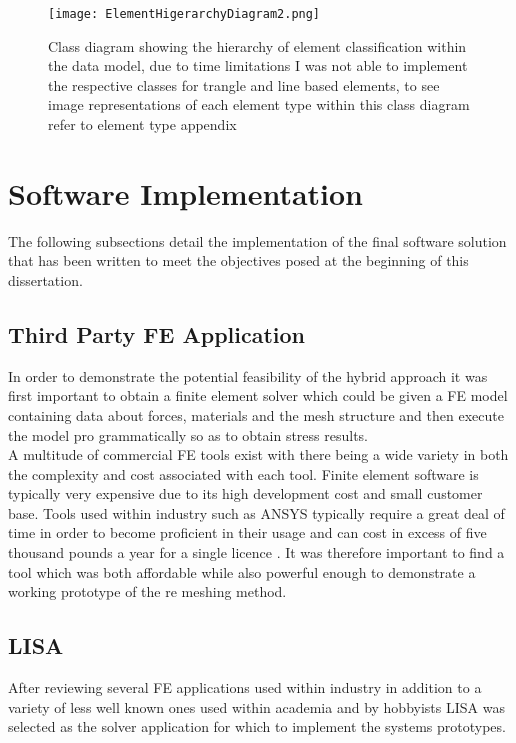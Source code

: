 \documentclass{article}
\begin{document}
\begin{figure}
  \centerline{\texttt{[image: ElementHigerarchyDiagram2.png]}}
  \caption{Class diagram showing the hierarchy of element classification within the data model, due to time limitations I was not able to implement the respective classes for trangle and line based elements, to see image representations of each element type within this class diagram refer to element type appendix}
  \label{fig:h-refinementImp}
\end{figure}


\section{Software Implementation}
The following subsections detail the implementation of the final software solution that has been written to meet the objectives posed at the beginning of this dissertation.

\subsection{Third Party FE Application}
In order to demonstrate the potential feasibility of the hybrid approach it was first important to obtain a finite element solver which could be given a FE model containing data about forces, materials and the mesh structure and then execute the model pro grammatically so as to obtain stress results. \\ 

\noindent
A multitude of commercial FE tools exist with there being a wide variety in both the complexity and cost associated with each tool. 
Finite element software is typically very expensive due to its high development cost and small customer base. Tools used within industry such as ANSYS typically require a great deal of time in order to become proficient in their usage and can cost in excess of five thousand pounds a year for a single licence \cite{AnsysCost}. It was therefore important to find a tool which was both affordable while also powerful enough to demonstrate a working prototype of the re meshing method.
 
\subsection{LISA}
After reviewing several FE applications used within industry in addition to a variety of less well known ones used within academia and by hobbyists LISA  was selected as the solver application for which to implement  the systems prototypes. \\ 
\end{document}
